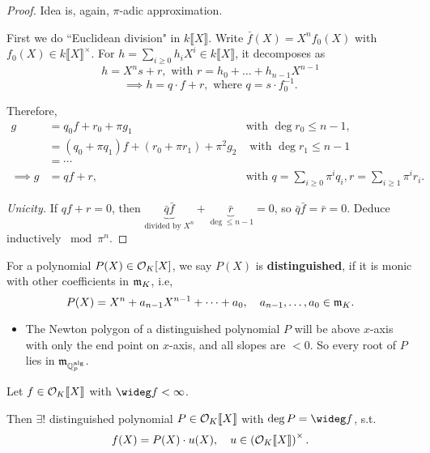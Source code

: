 \begin{proof}
    Idea is, again, $\pi$-adic approximation.
    
    First we do ``Euclidean division" in $k\llbracket X \rrbracket $.
    Write $\bar f(X) = X^nf_0(X)$ with $f_0(X)\in k\llbracket X \rrbracket^\times$.
    For $ h = \sum_{i\ge 0}h_iX^i\in k\llbracket X \rrbracket$,
    it decomposes as\[h = X^ns + r,\text{  with } r = h_0 + \dots + h_{n-1}X^{n-1}\]
    \[\implies h = q\cdot f + r, \text{  where } q = s\cdot f_0^{-1}.\]

    Therefore,\begin{align*}
        g &= q_0f + r_0 + \pi g_1 &\text{with } \deg r_0 \le n-1,\\
        &= (q_0 + \pi q_1)f + (r_0 + \pi r_1) + \pi^2 g_2 &\text{ with }\deg r_1\le n - 1\\
        &=\cdots & \\
    \implies g &= qf + r, &\text{with } q = \sum_{i\ge 0}\pi^iq_i, r = \sum_{i\ge 1}\pi^ir_i.
    \end{align*}

    \textit{Unicity.}
    If $qf + r = 0$, then $\underbrace{\bar{q}\bar{f}}_{\text{divided by }X^n} + \underbrace{\bar{r}}_{\deg\le n - 1} = 0$, so $\bar{q}\bar{f} = \bar{r} = 0$.
    Deduce inductively $\bmod \pi^n$.
\end{proof}

For a polynomial $P(X)\in \mathcal{O}_K[X]$, we say $P(X)$ is \textbf{distinguished}, if it is monic with other coefficients in $\mathfrak{m}_K$, i.e, \[P(X) = X^n + a_{n-1}X^{n-1} + \dots + a_0,\quad a_{n-1},\dots, a_0\in\mathfrak{m}_{K}.\]
\begin{itemize}
    \item The Newton polygon of a distinguished polynomial $P$ will be above $x$-axis with only the end point on $x$-axis, and all slopes are $ < 0$. So every root of $P$ lies in $\mathfrak{m}_{\mathbb{Q}_p^{\mathrm{alg}}}$.
\end{itemize}

\begin{theorem}\label{Weierstrass preparation}
    Let $f\in\mathcal{O}_K \llbracket X \rrbracket$ with $\wideg f < \infty$.\par
    Then $\exists !$ distinguished polynomial $P\in\mathcal{O}_K \llbracket X \rrbracket$ with $\deg P = \wideg f$, s.t. \[f(X) = P(X)\cdot u(X),\quad u\in\left( \mathcal{O}_K\llbracket X \rrbracket \right)^\times.\]
\end{theorem}

